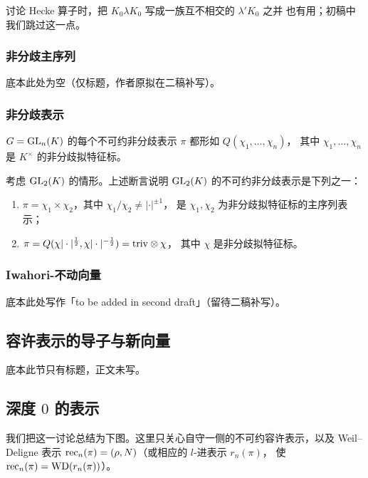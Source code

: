 讨论 Hecke 算子时，把 $K_0\lambda K_0$ 写成一族互不相交的 $\lambda'K_0$ 之并
也有用；初稿中我们跳过这一点。

\subsubsection{非分歧主序列}

底本此处为空（仅标题，作者原拟在二稿补写）。

\subsubsection{非分歧表示}

$G=\mathrm{GL}_n(K)$ 的每个不可约非分歧表示 $\pi$ 都形如 $Q(\chi_1,\dots,\chi_n)$，
其中 $\chi_1,\dots,\chi_n$ 是 $K^{\times}$ 的非分歧拟特征标。

\begin{example}
考虑 $\mathrm{GL}_2(K)$ 的情形。上述断言说明 $\mathrm{GL}_2(K)$ 的不可约非分歧表示是下列之一：
\begin{enumerate}[label=(\arabic*),leftmargin=2.2em]
\item $\pi=\chi_1\times\chi_2$，其中 $\chi_1/\chi_2\neq|\cdot|^{\pm 1}$，
      是 $\chi_1,\chi_2$ 为非分歧拟特征标的主序列表示；
\item $\pi=Q(\chi|\cdot|^{\frac12},\chi|\cdot|^{-\frac12})=\mathrm{triv}\otimes\chi$，
      其中 $\chi$ 是非分歧拟特征标。
\end{enumerate}
\end{example}

\subsubsection{Iwahori-不动向量}

底本此处写作「to be added in second draft」（留待二稿补写）。

\subsection{容许表示的导子与新向量}

底本此节只有标题，正文未写。

\subsection{深度 $0$ 的表示}

我们把这一讨论总结为下图。这里只关心自守一侧的不可约容许表示，以及
Weil--Deligne 表示 $\mathrm{rec}_n(\pi)=(\rho,N)$（或相应的 $l$-进表示 $r_n(\pi)$，
使 $\mathrm{rec}_n(\pi)=\mathrm{WD}(r_n(\pi))$）。

